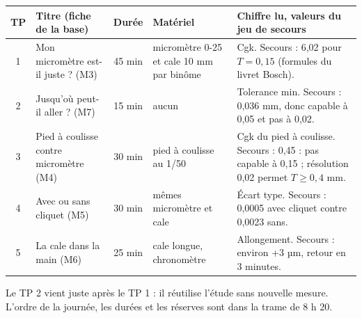 \documentclass[10pt,a4paper]{article}
\begin{document}
\thispagestyle{fancy}
\renewcommand{\arraystretch}{1.35}
\begin{tabularx}{\linewidth}{|c|>{\raggedright\arraybackslash}p{40mm}|c|>{\raggedright\arraybackslash}p{37mm}|>{\raggedright\arraybackslash}X|}\hline
\textbf{TP} & \textbf{Titre (fiche de la base)} & \textbf{Durée} & \textbf{Matériel} & \textbf{Chiffre lu, valeurs du jeu de secours}\\\hline
1 & Mon micromètre est-il juste ? (M3) & 45 min & micromètre 0-25 et cale 10 mm par binôme & Cgk. Secours : 6,02 pour $T = 0{,}15$ (formules du livret Bosch).\\\hline
2 & Jusqu'où peut-il aller ? (M7) & 15 min & aucun & Tolerance min. Secours : 0,036 mm, donc capable à 0,05 et pas à 0,02.\\\hline
3 & Pied à coulisse contre micromètre (M4) & 30 min & pied à coulisse au 1/50 & Cgk du pied à coulisse. Secours : 0,45 : pas capable à 0,15 ; résolution 0,02 permet $T \geq 0{,}4$ mm.\\\hline
4 & Avec ou sans cliquet (M5) & 30 min & mêmes micromètre et cale & Écart type. Secours : 0,0005 avec cliquet contre 0,0023 sans.\\\hline
5 & La cale dans la main (M6) & 25 min & cale longue, chronomètre & Allongement. Secours : environ +3 µm, retour en 3 minutes.\\\hline
\end{tabularx}
\par\smallskip
Le TP 2 vient juste après le TP 1 : il réutilise l'étude sans nouvelle mesure. L'ordre de la journée, les durées et les réserves sont dans la trame de 8 h 20.
\end{document}

